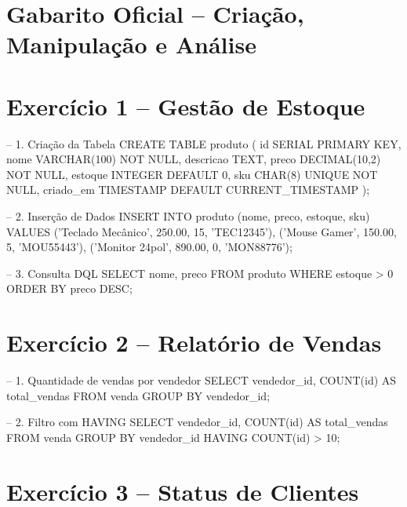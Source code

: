 \documentclass[12pt]{article}
\begin{document}
\section*{Gabarito Oficial – Criação, Manipulação e Análise}

\hrulefill

\section*{Exercício 1 – Gestão de Estoque}



\begin{sqlcode}
-- 1. Criação da Tabela
CREATE TABLE produto (
    id SERIAL PRIMARY KEY,
    nome VARCHAR(100) NOT NULL,
    descricao TEXT,
    preco DECIMAL(10,2) NOT NULL,
    estoque INTEGER DEFAULT 0,
    sku CHAR(8) UNIQUE NOT NULL,
    criado_em TIMESTAMP DEFAULT CURRENT_TIMESTAMP
);

-- 2. Inserção de Dados
INSERT INTO produto (nome, preco, estoque, sku) VALUES
('Teclado Mecânico', 250.00, 15, 'TEC12345'),
('Mouse Gamer', 150.00, 5, 'MOU55443'),
('Monitor 24pol', 890.00, 0, 'MON88776');

-- 3. Consulta DQL
SELECT nome, preco 
FROM produto 
WHERE estoque > 0 
ORDER BY preco DESC;
\end{sqlcode}

\hrulefill

\section*{Exercício 2 – Relatório de Vendas}



\begin{sqlcode}
-- 1. Quantidade de vendas por vendedor
SELECT vendedor_id, COUNT(id) AS total_vendas
FROM venda
GROUP BY vendedor_id;

-- 2. Filtro com HAVING
SELECT vendedor_id, COUNT(id) AS total_vendas
FROM venda
GROUP BY vendedor_id
HAVING COUNT(id) > 10;
\end{sqlcode}

\hrulefill

\section*{Exercício 3 – Status de Clientes}
\end{document}
